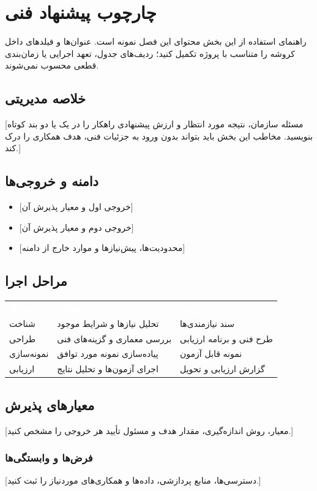 \begingroup
\chapter{چارچوب پیشنهاد فنی}
\begin{DSCBox}{راهنمای استفاده از این بخش}
محتوای این فصل نمونه است. عنوان‌ها و فیلدهای داخل کروشه را متناسب با پروژه تکمیل کنید؛ ردیف‌های جدول، تعهد اجرایی یا زمان‌بندی قطعی محسوب نمی‌شوند.
\end{DSCBox}
\section{خلاصه مدیریتی}
[مسئله سازمان، نتیجه مورد انتظار و ارزش پیشنهادی راهکار را در یک یا دو بند کوتاه بنویسید. مخاطب این بخش باید بتواند بدون ورود به جزئیات فنی، هدف همکاری را درک کند.]
\section{دامنه و خروجی‌ها}
\begin{itemize}
\item {}[خروجی اول و معیار پذیرش آن]
\item {}[خروجی دوم و معیار پذیرش آن]
\item {}[محدودیت‌ها، پیش‌نیازها و موارد خارج از دامنه]
\end{itemize}
\section{مراحل اجرا}
\renewcommand{\arraystretch}{1.35}
\begin{tabularx}{\linewidth}{@{}>{\raggedleft\arraybackslash}p{27mm}>{\raggedleft\arraybackslash}X>{\raggedleft\arraybackslash}p{43mm}@{}}
\rowcolor{DSCNavy}\textcolor{white}{\bfseries مرحله} & \textcolor{white}{\bfseries فعالیت} & \textcolor{white}{\bfseries خروجی}\\
\rowcolor{DSCPale}شناخت & تحلیل نیازها و شرایط موجود & سند نیازمندی‌ها\\
طراحی & بررسی معماری و گزینه‌های فنی & طرح فنی و برنامه ارزیابی\\
\rowcolor{DSCPale}نمونه‌سازی & پیاده‌سازی نمونه مورد توافق & نمونه قابل آزمون\\
ارزیابی & اجرای آزمون‌ها و تحلیل نتایج & گزارش ارزیابی و تحویل\\
\end{tabularx}
\section{معیارهای پذیرش}
[معیار، روش اندازه‌گیری، مقدار هدف و مسئول تأیید هر خروجی را مشخص کنید.]
\subsection{فرض‌ها و وابستگی‌ها}
[دسترسی‌ها، منابع پردازشی، داده‌ها و همکاری‌های موردنیاز را ثبت کنید.]
\par\endgroup
